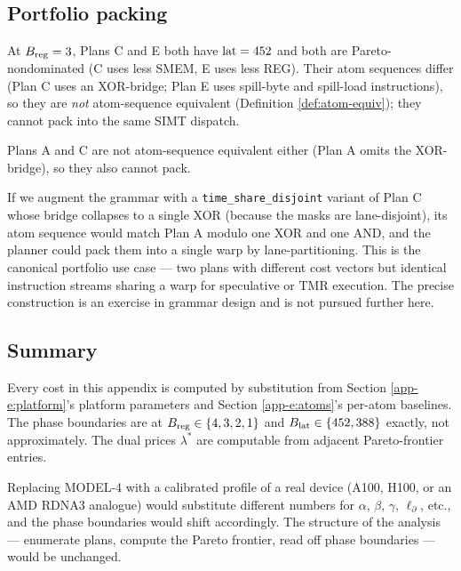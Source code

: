 \subsection{Portfolio packing}\label{app-e:portfolio}

At $B_{\operatorname{reg}} = 3$, Plans C and E both have
$\operatorname{lat} = 452$ and both are Pareto-nondominated
(C uses less SMEM, E uses less REG). Their atom
sequences differ (Plan C uses an XOR-bridge; Plan E
uses spill-byte and spill-load instructions), so
they are \emph{not} atom-sequence equivalent
(Definition \ref{def:atom-equiv}); they cannot pack
into the same SIMT dispatch.

Plans A and C are not atom-sequence equivalent
either (Plan A omits the XOR-bridge), so they also
cannot pack.

If we augment the grammar with a
\texttt{time\_share\_disjoint} variant of Plan C
whose bridge collapses to a single XOR (because the
masks are lane-disjoint), its atom sequence would
match Plan A modulo one XOR and one AND, and the
planner could pack them into a single warp by
lane-partitioning. This is the canonical portfolio
use case --- two plans with different cost vectors
but identical instruction streams sharing a warp
for speculative or TMR execution. The precise
construction is an exercise in grammar design and
is not pursued further here.

\subsection{Summary}\label{app-e:summary}

Every cost in this appendix is computed by
substitution from Section \ref{app-e:platform}'s
platform parameters and Section \ref{app-e:atoms}'s
per-atom baselines. The phase boundaries are at
$B_{\operatorname{reg}} \in \{4, 3, 2, 1\}$ and $B_{\operatorname{lat}} \in
\{452, 388\}$ exactly, not approximately. The dual
prices $\lambda^*$ are computable from adjacent
Pareto-frontier entries.

Replacing MODEL-4 with a calibrated profile of a
real device (A100, H100, or an AMD RDNA3 analogue)
would substitute different numbers for $\alpha$,
$\beta$, $\gamma$, $\ell_\partial$, etc., and the
phase boundaries would shift accordingly. The
structure of the analysis --- enumerate plans,
compute the Pareto frontier, read off phase
boundaries --- would be unchanged.
